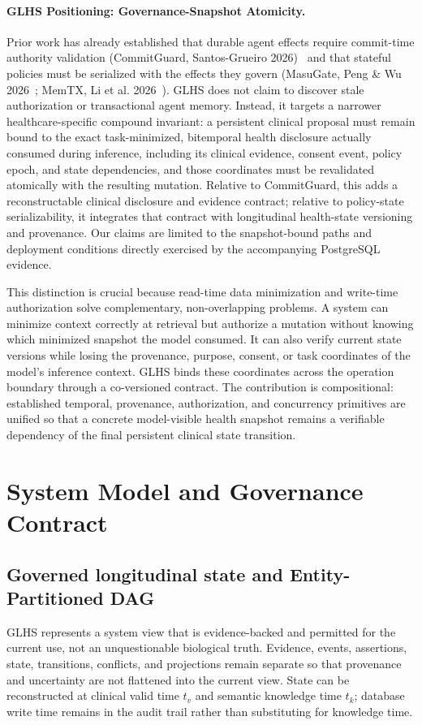 \documentclass[11pt]{article}
\begin{document}
\paragraph{GLHS Positioning: Governance-Snapshot Atomicity.}
Prior work has already established that durable agent effects require commit-time authority validation (CommitGuard, Santos-Grueiro 2026)~\cite{temporaryauth} and that stateful policies must be serialized with the effects they govern (MasuGate, Peng \& Wu 2026~\cite{statefulgov}; MemTX, Li et al. 2026~\cite{memtx}). GLHS does not claim to discover stale authorization or transactional agent memory. Instead, it targets a narrower healthcare-specific compound invariant: a persistent clinical proposal must remain bound to the exact task-minimized, bitemporal health disclosure actually consumed during inference, including its clinical evidence, consent event, policy epoch, and state dependencies, and those coordinates must be revalidated atomically with the resulting mutation. Relative to CommitGuard, this adds a reconstructable clinical disclosure and evidence contract; relative to policy-state serializability, it integrates that contract with longitudinal health-state versioning and provenance. Our claims are limited to the snapshot-bound paths and deployment conditions directly exercised by the accompanying PostgreSQL evidence.

This distinction is crucial because read-time data minimization and write-time authorization solve complementary, non-overlapping problems. A system can minimize context correctly at retrieval but authorize a mutation without knowing which minimized snapshot the model consumed. It can also verify current state versions while losing the provenance, purpose, consent, or task coordinates of the model's inference context. GLHS binds these coordinates across the operation boundary through a co-versioned contract. The contribution is compositional: established temporal, provenance, authorization, and concurrency primitives are unified so that a concrete model-visible health snapshot remains a verifiable dependency of the final persistent clinical state transition.

\section{System Model and Governance Contract}
\subsection{Governed longitudinal state and Entity-Partitioned DAG}
GLHS represents a system view that is evidence-backed and permitted for the current use, not an unquestionable biological truth. Evidence, events, assertions, state, transitions, conflicts, and projections remain separate so that provenance and uncertainty are not flattened into the current view. State can be reconstructed at clinical valid time $t_v$ and semantic knowledge time $t_k$; database write time remains in the audit trail rather than substituting for knowledge time.
\end{document}
